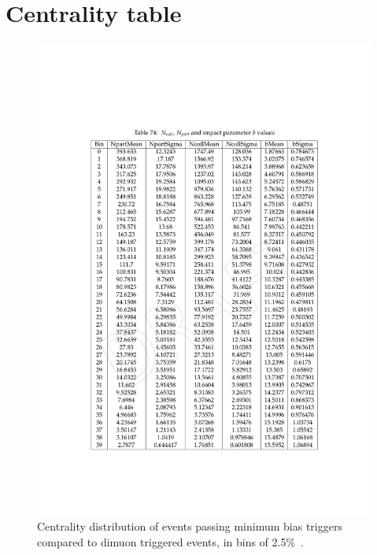 \chapter{Centrality table}
\label{sCentrality}
\begin{figure}[!htb]
  \begin{center}
    \includegraphics{Chapters/xLHCMS/CentralityTable.pdf}
    \caption{Centrality distribution of events passing minimum bias
      triggers compared to dimuon triggered events, in bins of 2.5\%~\cite{torsten}.} 
    \label{tab:centralitytable}
  \end{center}
\end{figure}
